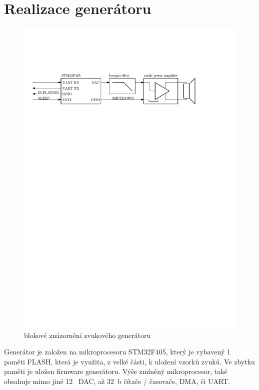 \section{Realizace generátoru}
\begin{figure}[H]
    \begin{center}
        \includegraphics[width=\textwidth]{img/sound-system}
    \end{center}
    \caption{blokové znázornění zvukového generátoru}
\end{figure}

Generátor je založen na mikroprocesoru STM32F405, který je vybavený 1~ paměti FLASH, která je využita, z velké části, k uložení vzorků zvuků. Ve zbytku paměti je uložen firmware generátoru. Výše zmíněný mikroprocesor, také obsahuje mimo jiné 12~ DAC, až 32\jedn~{b} čítače / časovače, DMA, či
UART.

